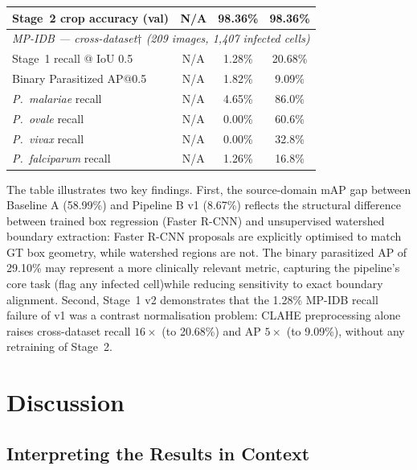 \documentclass[review,12pt]{elsarticle}
\begin{document}
\begin{table}[H]
\begin{tabular}{lccc}
Stage~2 crop accuracy (val)     & N/A      & 98.36\%  & 98.36\% \\
\midrule
\multicolumn{4}{l}{\textit{MP-IDB --- cross-dataset$\dagger$ (209 images,
  1{,}407 infected cells)}} \\
Stage~1 recall @ IoU 0.5       & N/A      & 1.28\%   & 20.68\% \\
Binary Parasitized AP@0.5      & N/A      & 1.82\%   & 9.09\% \\
\textit{P.\ malariae} recall  & N/A      & 4.65\%   & 86.0\% \\
\textit{P.\ ovale} recall     & N/A      & 0.00\%   & 60.6\% \\
\textit{P.\ vivax} recall     & N/A      & 0.00\%   & 32.8\% \\
\textit{P.\ falciparum} recall & N/A     & 1.26\%   & 16.8\% \\
\bottomrule
\end{tabular}
\end{table}

The table illustrates two key findings. First, the source-domain mAP gap
between Baseline A (58.99\%) and Pipeline B v1 (8.67\%) reflects the
structural difference between trained box regression (Faster R-CNN) and
unsupervised watershed boundary extraction: Faster R-CNN proposals are
explicitly optimised to match GT box geometry, while watershed regions are
not. The binary parasitized AP of 29.10\% may represent a more clinically relevant metric, capturing the pipeline's core task (flag any infected cell)while reducing sensitivity to exact boundary alignment. Second, Stage~1 v2 demonstrates that the 1.28\% MP-IDB recall failure of v1 was a contrast normalisation problem:
CLAHE preprocessing alone raises cross-dataset recall $16\times$ (to
20.68\%) and AP $5\times$ (to 9.09\%), without any retraining of Stage~2.

\section{Discussion}
\label{sec:discussion}

\subsection{Interpreting the Results in Context}
\label{ssec:interpret}
\end{document}
